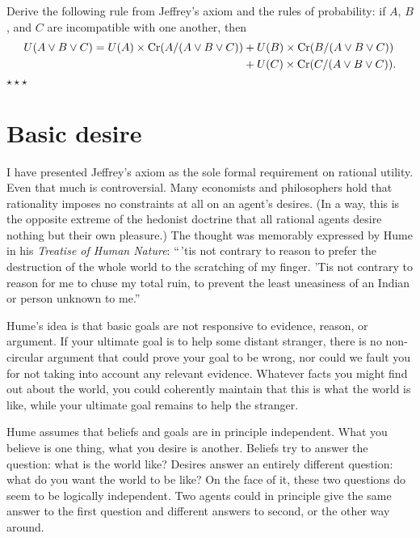 \begin{exercise}
  Derive the following rule from Jeffrey's axiom and the rules of probability: 
  if $A$, $B$, and $C$ are incompatible with one another, then 
  \begin{align*} U(A \lor B \lor C) =
  U(A)\times \text{Cr}(A/(A\lor B \lor C)) &+ U(B)\times \text{Cr}(B/(A \lor B \lor C))\\
  &+ U(C)\times\text{Cr}(C/(A \lor B\lor C)).
  \end{align*}
  $\star\star\star$
\end{exercise}


\section{Basic desire}\label{sec:basic-desire}


I have presented Jeffrey's axiom as the sole formal requirement on
rational utility. Even that much is controversial. Many economists and
philosophers hold that rationality imposes no constraints at all on an
agent's desires. (In a way, this is the opposite extreme of the
hedonist doctrine that all rational agents desire nothing but their
own pleasure.) The thought was memorably expressed by Hume in his
\emph{Treatise of Human Nature}: ``\,'tis not contrary to reason to
prefer the destruction of the whole world to the scratching of my
finger. 'Tis not contrary to reason for me to chuse my total ruin, to
prevent the least uneasiness of an Indian or person unknown to me.''

Hume's idea is that basic goals are not responsive to evidence,
reason, or argument. If your ultimate goal is to help some distant
stranger, there is no non-circular argument that could prove your goal
to be wrong, nor could we fault you for not taking into account any
relevant evidence. Whatever facts you might find out about the world,
you could coherently maintain that this is what the world is like,
while your ultimate goal remains to help the stranger.

Hume assumes that beliefs and goals are in principle independent. What
you believe is one thing, what you desire is another. Beliefs try to
answer the question: what is the world like? Desires answer an
entirely different question: what do you want the world to be like?
On the face of it, these two questions do seem to be logically
independent. Two agents could in principle give the same answer to the
first question and different answers to second, or the other way
around.

